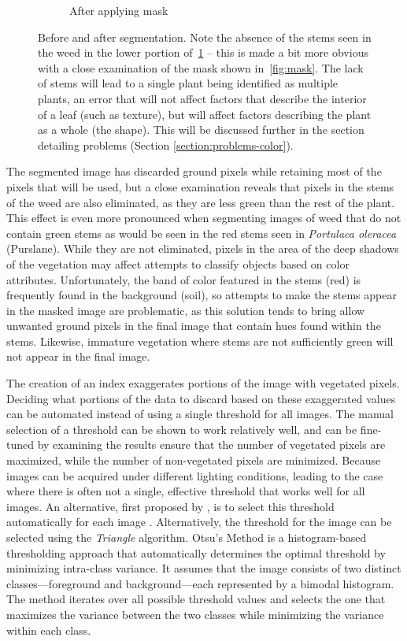 \documentclass[letterpaper]{report}
\begin{document}
{\begin{figure}[H]
\begin{subfigure}[h]{.30\textwidth}
	  \caption{After applying mask}
	  \label{fig:original-masked}
	\end{subfigure}
	\caption[Before and after segmentation]{Before and after segmentation. Note the absence of the stems seen in the weed in the lower portion of~\ref{fig:original-masked} -- this is made a bit more obvious with a close examination of the mask shown in~\ref{fig:mask}. The lack of stems will lead to a single plant being identified as multiple plants, an error that will not affect factors that describe the interior of a leaf (such as texture), but will affect factors describing the plant as a whole (the shape). This will be discussed further in the section detailing problems (Section \ref{section:problems-color}).}
	\label{fig:segmentation}
\end{figure}
The segmented image has discarded ground pixels while retaining most of the pixels that will be used, but a close examination reveals that pixels in the stems of the weed are also eliminated, as they are less green than the rest of the plant. This effect is even more pronounced when segmenting images of weed that do not contain green stems as would be seen in the red stems seen in \textit{Portulaca oleracea} (Purslane). While they are not eliminated, pixels in the area of the deep shadows of the vegetation may affect attempts to classify objects based on color attributes. Unfortunately, the band of color featured in the stems (red) is frequently found in the background (soil), so attempts to make the stems appear in the masked image are problematic, as this solution tends to bring allow unwanted ground pixels in the final image that contain hues found within the stems. Likewise, immature vegetation where stems are not sufficiently green will not appear in the final image. 

The creation of an index exaggerates portions of the image with vegetated pixels. Deciding what portions of the data to discard based on these exaggerated values can be automated instead of using a single threshold for all images. The manual selection of a threshold can be shown to work relatively well, and can be fine-tuned by examining the results ensure that the number of vegetated pixels are maximized, while the number of non-vegetated pixels are minimized. Because images can be acquired under different lighting conditions, leading to the case where there is often not a single, effective threshold that works well for all images. An alternative, first proposed by \citeauthor{Otsu1979-io}, is to select this threshold automatically for each image \cite{Otsu1979-io}. Alternatively, the threshold for the image can be selected using the \textit{Triangle} algorithm.
Otsu’s Method is a histogram-based thresholding approach that automatically determines the optimal threshold by minimizing intra-class variance. It assumes that the image consists of two distinct classes—foreground and background—each represented by a bimodal histogram. The method iterates over all possible threshold values and selects the one that maximizes the variance between the two classes while minimizing the variance within each class.

}
\end{document}
